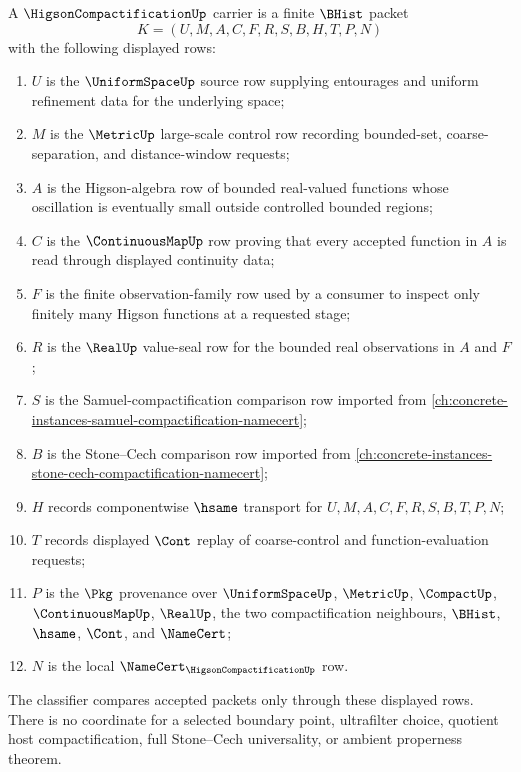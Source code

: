 \begin{definition}
\label{def:higson-compactification-carrier}
A $\HigsonCompactificationUp$ carrier is a finite $\BHist$ packet
$$
K=(U,M,A,C,F,R,S,B,H,T,P,N)
$$
with the following displayed rows:
\begin{enumerate}
\item $U$ is the $\UniformSpaceUp$ source row supplying entourages and uniform refinement data for the underlying space;
\item $M$ is the $\MetricUp$ large-scale control row recording bounded-set, coarse-separation, and distance-window requests;
\item $A$ is the Higson-algebra row of bounded real-valued functions whose oscillation is eventually small outside controlled bounded regions;
\item $C$ is the $\ContinuousMapUp$ row proving that every accepted function in $A$ is read through displayed continuity data;
\item $F$ is the finite observation-family row used by a consumer to inspect only finitely many Higson functions at a requested stage;
\item $R$ is the $\RealUp$ value-seal row for the bounded real observations in $A$ and $F$;
\item $S$ is the Samuel-compactification comparison row imported from \autoref{ch:concrete-instances-samuel-compactification-namecert};
\item $B$ is the Stone--Cech comparison row imported from \autoref{ch:concrete-instances-stone-cech-compactification-namecert};
\item $H$ records componentwise $\hsame$ transport for $U,M,A,C,F,R,S,B,T,P,N$;
\item $T$ records displayed $\Cont$ replay of coarse-control and function-evaluation requests;
\item $P$ is the $\Pkg$ provenance over $\UniformSpaceUp$, $\MetricUp$, $\CompactUp$, $\ContinuousMapUp$, $\RealUp$, the two compactification neighbours, $\BHist$, $\hsame$, $\Cont$, and $\NameCert$;
\item $N$ is the local $\NameCert_{\HigsonCompactificationUp}$ row.
\end{enumerate}
The classifier compares accepted packets only through these displayed rows. There is no coordinate for a selected boundary point, ultrafilter choice, quotient host compactification, full Stone--Cech universality, or ambient properness theorem.
\end{definition}

